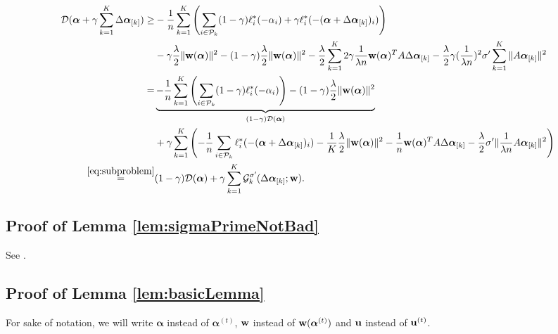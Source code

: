 \documentclass{article}
\newcommand{\uv}{ {\bf u}}
\newcommand{\wv}{ {\bf w}}
\newcommand{\alphav}{ {\boldsymbol \alpha}}
\newcommand{\0}{ {\bf 0}}
\newcommand{\vsubset}[2]{#1_{[#2]}}
\newcommand{\vc}[2]{#1^{(#2)}}                   %
\newcommand{\bD}{\mathcal{D}}
\newcommand{\Ggk}{\mathcal{G}^{\sigma'}_k\hspace{-0.08em}}
\theoremstyle{plain}
\theoremstyle{definition}
\begin{document}
\begin{align*}
\nonumber
 \bD(\alphav
+\gamma 
\sum_{k=1}^K
\vsubset{\Delta \alphav}{k}
)
 \ge&
-\frac1n\sum_{k=1}^K
 \left(
 \sum_{i\in \mathcal{P}_k}
 (1-\gamma) \ell_i^*(-
   \alpha_i)
   +\gamma 
  \ell_i^*(-(\alphav + \vsubset{\Delta \alphav}{k})_i)
 \right)
\\
&   
-\gamma  \frac\lambda2 \|\wv(\alphav)   \|^2
-(1-\gamma)  \frac\lambda2 \|\wv(\alphav)   \|^2
-\frac\lambda2  
\sum_{k=1}^K
2\gamma\frac1{\lambda n} 
\wv(\alphav)^T  
    A\vsubset{\Delta \alphav}{k}  
 -\frac\lambda2 
\gamma
(\frac1{\lambda n})^2
\sigma'
   \sum_{k=1}^K \|A \vsubset{\alphav}{k}\|^2
\\%
 =&
 \underbrace{
 -\frac1n\sum_{k=1}^K
 \left(
 \sum_{i\in \mathcal{P}_k}
 (1-\gamma) \ell_i^*(-
   \alpha_i) 
 \right)
-(1-\gamma)  \frac\lambda2 \|\wv(\alphav)   \|^2 
}_{(1-\gamma) \bD(\alphav)}
\\
& 
+  
\gamma 
 \sum_{k=1}^K
 \left(
 -\frac1n
 \sum_{i\in \mathcal{P}_k}
   \ell_i^*(-(\alphav + \vsubset{\Delta \alphav}{k})_i)
   - \frac1{K} \frac\lambda2 \|\wv(\alphav)   \|^2
   -   
  \frac1{n} 
\wv(\alphav)^T  
    A\vsubset{\Delta \alphav}{k}
    -\frac\lambda2  
\sigma'  \|\frac1{\lambda n}A \vsubset{\alphav}{k}\|^2    
 \right)
\\
\overset{\eqref{eq:subproblem}}{=}& (1-\gamma) \bD(\alphav)
 +\gamma \sum_{k=1}^K \Ggk(  \vsubset{\Delta \alphav}{k}; \wv).   
\end{align*}
 

 


\subsection{Proof of Lemma \ref{lem:sigmaPrimeNotBad}}

See \cite{richtarik2013distributed}. %



\subsection{Proof of Lemma \ref{lem:basicLemma}}
For sake of notation, 
we will write 
$\alphav$ instead of $\vc{\alphav}{t}$,
$\wv$ instead of $\wv(\vc{\alphav}{t})$
and
$\uv$ instead of $\vc{\uv}{t}$. 
\end{document}
